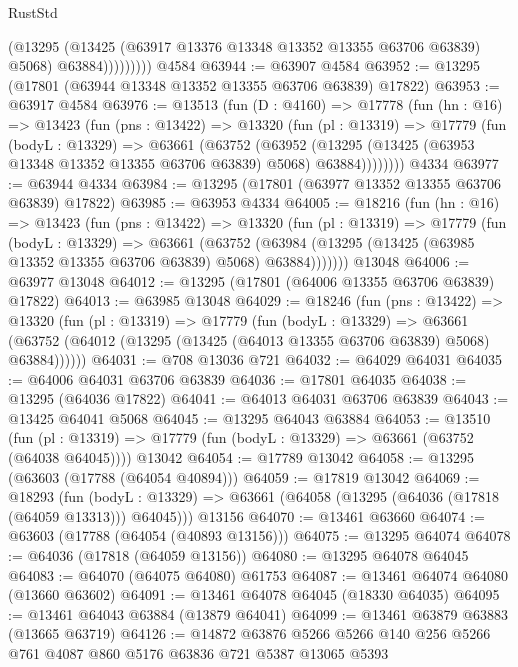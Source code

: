 \begin{lexlean}{RustStd}
\begin{coremodule}
                    (@13295
                      (@13425 (@63917 @13376 @13348 @13352 @13355 @63706 @63839) @5068)
                      @63884)))))))))
    @4584
@63944 := @63907 @4584
@63952 := @13295 (@17801 (@63944 @13348 @13352 @13355 @63706 @63839) @17822)
@63953 := @63917 @4584
@63976 := @13513
    (fun (D : @4160) =>
    @17778
      (fun (hn : @16) =>
      @13423
        (fun (pns : @13422) =>
        @13320
          (fun (pl : @13319) =>
          @17779
            (fun (bodyL : @13329) =>
            @63661
              (@63752
                (@63952
                  (@13295 (@13425 (@63953 @13348 @13352 @13355 @63706 @63839) @5068) @63884))))))))
    @4334
@63977 := @63944 @4334
@63984 := @13295 (@17801 (@63977 @13352 @13355 @63706 @63839) @17822)
@63985 := @63953 @4334
@64005 := @18216
    (fun (hn : @16) =>
    @13423
      (fun (pns : @13422) =>
      @13320
        (fun (pl : @13319) =>
        @17779
          (fun (bodyL : @13329) =>
          @63661
            (@63752
              (@63984 (@13295 (@13425 (@63985 @13352 @13355 @63706 @63839) @5068) @63884)))))))
    @13048
@64006 := @63977 @13048
@64012 := @13295 (@17801 (@64006 @13355 @63706 @63839) @17822)
@64013 := @63985 @13048
@64029 := @18246
    (fun (pns : @13422) =>
    @13320
      (fun (pl : @13319) =>
      @17779
        (fun (bodyL : @13329) =>
        @63661 (@63752 (@64012 (@13295 (@13425 (@64013 @13355 @63706 @63839) @5068) @63884))))))
@64031 := @708 @13036 @721
@64032 := @64029 @64031
@64035 := @64006 @64031 @63706 @63839
@64036 := @17801 @64035
@64038 := @13295 (@64036 @17822)
@64041 := @64013 @64031 @63706 @63839
@64043 := @13425 @64041 @5068
@64045 := @13295 @64043 @63884
@64053 := @13510
    (fun (pl : @13319) => @17779 (fun (bodyL : @13329) => @63661 (@63752 (@64038 @64045))))
    @13042
@64054 := @17789 @13042
@64058 := @13295 (@63603 (@17788 (@64054 @40894)))
@64059 := @17819 @13042
@64069 := @18293
    (fun (bodyL : @13329) => @63661 (@64058 (@13295 (@64036 (@17818 (@64059 @13313))) @64045)))
    @13156
@64070 := @13461 @63660
@64074 := @63603 (@17788 (@64054 (@40893 @13156)))
@64075 := @13295 @64074
@64078 := @64036 (@17818 (@64059 @13156))
@64080 := @13295 @64078 @64045
@64083 := @64070 (@64075 @64080) @61753
@64087 := @13461 @64074 @64080 (@13660 @63602)
@64091 := @13461 @64078 @64045 (@18330 @64035)
@64095 := @13461 @64043 @63884 (@13879 @64041)
@64099 := @13461 @63879 @63883 (@13665 @63719)
@64126 := @14872
    @63876
    @5266
    @5266
    @140
    @256
    @5266
    @761
    @4087
    @860
    @5176
    @63836
    @721
    @5387
    @13065
    @5393

\end{coremodule}
\end{lexlean}
